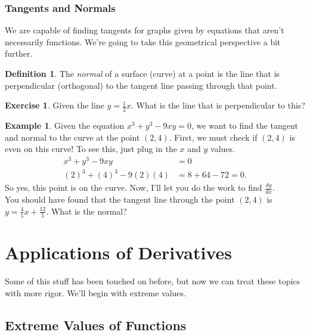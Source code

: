 \documentclass[leqno]{article}
\theoremstyle{definition}
\newtheorem{definition}{Definition}[section]
\newtheorem{example}{Example}[section]
\newtheorem{exercise}{Exercise}[section]
\theoremstyle{remark}
\theoremstyle{theorem}
\begin{document}
\subsubsection{Tangents and Normals}

We are capable of finding tangents for graphs given by equations that aren't necessarily functions.  We're going to take this geometrical perspective a bit further.  

\begin{definition}
The \emph{normal} of a surface (curve) at a point is the line that is perpendicular (orthogonal) to the tangent line passing through that point.
\end{definition}

\begin{exercise}
Given the line $y=\frac{1}{2}x$. What is the line that is perpendicular to this?
\vspace*{3cm}\\
\end{exercise}

\begin{example}
Given the equation $x^3+y^3-9xy=0$, we want to find the tangent and normal to the curve at the point $(2,4)$.  First, we must check if $(2,4)$ is even on this curve! To see this, just plug in the $x$ and $y$ values.
\begin{align*}
x^3+y^3-9xy&=0\\
(2)^3+(4)^3-9(2)(4)&=8+64-72=0.
\end{align*}
So yes, this point is on the curve. Now, I'll let you do the work to find $\frac{dy}{dx}$. 
\vspace*{6cm}\\
You should have found that the tangent line through the point $(2,4)$ is $y=\frac{4}{5}x+\frac{12}{5}$.  What is the normal?
\vspace*{3cm}
\end{example}

\section{Applications of Derivatives}

Some of this stuff has been touched on before, but now we can treat these topics with more rigor.  We'll begin with extreme values.

\subsection{Extreme Values of Functions}
\end{document}
